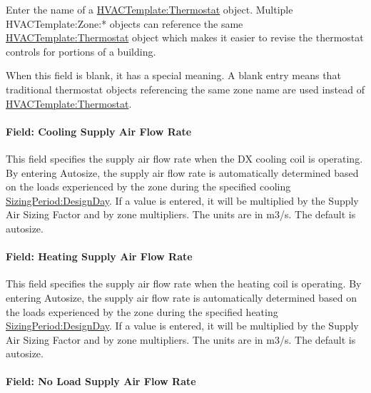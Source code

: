 Enter the name of a \hyperref[hvactemplatethermostat]{HVACTemplate:Thermostat} object. Multiple HVACTemplate:Zone:* objects can reference the same \hyperref[hvactemplatethermostat]{HVACTemplate:Thermostat} object which makes it easier to revise the thermostat controls for portions of a building.

When this field is blank, it has a special meaning. A blank entry means that traditional thermostat objects referencing the same zone name are used instead of \hyperref[hvactemplatethermostat]{HVACTemplate:Thermostat}.

\paragraph{Field: Cooling Supply Air Flow Rate}\label{field-cooling-supply-air-flow-rate-000}

This field specifies the supply air flow rate when the DX cooling coil is operating. By entering Autosize, the supply air flow rate is automatically determined based on the loads experienced by the zone during the specified cooling \hyperref[sizingperioddesignday]{SizingPeriod:DesignDay}. If a value is entered, it will be multiplied by the Supply Air Sizing Factor and by zone multipliers. The units are in m3/s. The default is autosize.

\paragraph{Field: Heating Supply Air Flow Rate}\label{field-heating-supply-air-flow-rate-000}

This field specifies the supply air flow rate when the heating coil is operating. By entering Autosize, the supply air flow rate is automatically determined based on the loads experienced by the zone during the specified heating \hyperref[sizingperioddesignday]{SizingPeriod:DesignDay}. If a value is entered, it will be multiplied by the Supply Air Sizing Factor and by zone multipliers. The units are in m3/s. The default is autosize.

\paragraph{Field: No Load Supply Air Flow Rate}\label{field-no-load-supply-air-flow-rate}


